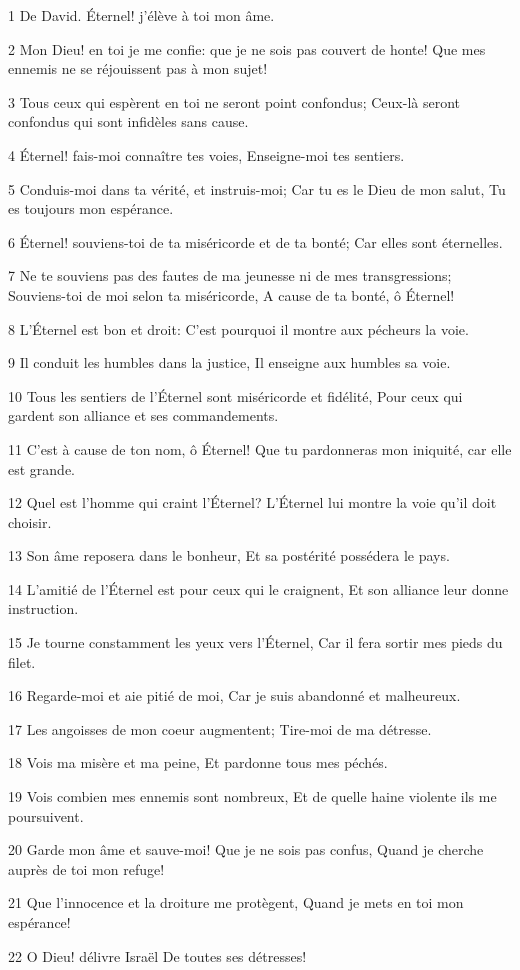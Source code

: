 \par 1 De David. Éternel! j'élève à toi mon âme.
\par 2 Mon Dieu! en toi je me confie: que je ne sois pas couvert de honte! Que mes ennemis ne se réjouissent pas à mon sujet!
\par 3 Tous ceux qui espèrent en toi ne seront point confondus; Ceux-là seront confondus qui sont infidèles sans cause.
\par 4 Éternel! fais-moi connaître tes voies, Enseigne-moi tes sentiers.
\par 5 Conduis-moi dans ta vérité, et instruis-moi; Car tu es le Dieu de mon salut, Tu es toujours mon espérance.
\par 6 Éternel! souviens-toi de ta miséricorde et de ta bonté; Car elles sont éternelles.
\par 7 Ne te souviens pas des fautes de ma jeunesse ni de mes transgressions; Souviens-toi de moi selon ta miséricorde, A cause de ta bonté, ô Éternel!
\par 8 L'Éternel est bon et droit: C'est pourquoi il montre aux pécheurs la voie.
\par 9 Il conduit les humbles dans la justice, Il enseigne aux humbles sa voie.
\par 10 Tous les sentiers de l'Éternel sont miséricorde et fidélité, Pour ceux qui gardent son alliance et ses commandements.
\par 11 C'est à cause de ton nom, ô Éternel! Que tu pardonneras mon iniquité, car elle est grande.
\par 12 Quel est l'homme qui craint l'Éternel? L'Éternel lui montre la voie qu'il doit choisir.
\par 13 Son âme reposera dans le bonheur, Et sa postérité possédera le pays.
\par 14 L'amitié de l'Éternel est pour ceux qui le craignent, Et son alliance leur donne instruction.
\par 15 Je tourne constamment les yeux vers l'Éternel, Car il fera sortir mes pieds du filet.
\par 16 Regarde-moi et aie pitié de moi, Car je suis abandonné et malheureux.
\par 17 Les angoisses de mon coeur augmentent; Tire-moi de ma détresse.
\par 18 Vois ma misère et ma peine, Et pardonne tous mes péchés.
\par 19 Vois combien mes ennemis sont nombreux, Et de quelle haine violente ils me poursuivent.
\par 20 Garde mon âme et sauve-moi! Que je ne sois pas confus, Quand je cherche auprès de toi mon refuge!
\par 21 Que l'innocence et la droiture me protègent, Quand je mets en toi mon espérance!
\par 22 O Dieu! délivre Israël De toutes ses détresses!

